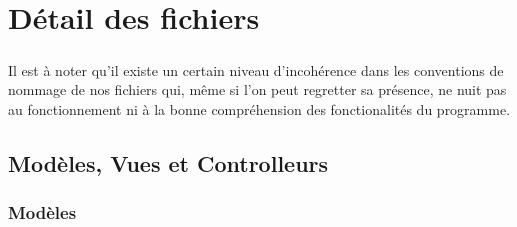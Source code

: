 \chapter{Détail des fichiers}

\paragraph{}
    Il est à noter qu'il existe un certain niveau d'incohérence dans les
    conventions de nommage de nos fichiers qui, même si l'on peut regretter
    sa présence, ne nuit pas au fonctionnement ni à la bonne compréhension
    des fonctionalités du programme.

\section{Modèles, Vues et Controlleurs}
    \subsection{Modèles}
